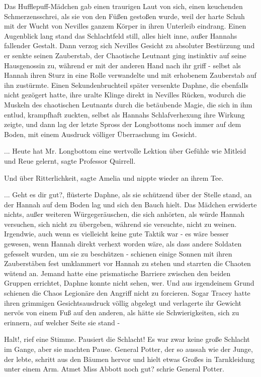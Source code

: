 Das Hufflepuff-Mädchen gab einen traurigen Laut von sich, einen keuchenden
Schmerzensschrei, als sie von den Füßen gestoßen wurde, weil der harte Schuh mit
der Wucht von Nevilles ganzem Körper in ihren Unterleib eindrang. Einen
Augenblick lang stand das Schlachtfeld still, alles hielt inne, außer Hannahs
fallender Gestalt. Dann verzog sich Nevilles Gesicht zu absoluter Bestürzung und
er senkte seinen Zauberstab, der Chaotische Leutnant ging instinktiv auf seine
Hausgenossin zu, während er mit der anderen Hand nach ihr griff - selbst als
Hannah ihren Sturz in eine Rolle verwandelte und mit erhobenem Zauberstab auf
ihn zustürmte. Einen Sekundenbruchteil später versenkte Daphne, die ebenfalls
nicht gezögert hatte, ihre uralte Klinge direkt in Nevilles Rücken, wodurch die
Muskeln des chaotischen Leutnants durch die betäubende Magie, die sich in ihm
entlud, krampfhaft zuckten, selbst als Hannahs Schlafverhexung ihre Wirkung
zeigte, und dann lag der letzte Spross der Longbottoms noch immer auf dem Boden,
mit einem Ausdruck völliger Überraschung im Gesicht.

... \glqq{}Heute hat Mr. Longbottom eine wertvolle Lektion über Gefühle wie
Mitleid und Reue gelernt\grqq{}, sagte Professor Quirrell.

\glqq{}Und über Ritterlichkeit\grqq{}, sagte Amelia und nippte wieder an ihrem
Tee.

... \glqq{}Geht es dir gut?\grqq{}, flüsterte Daphne, als sie schützend über der
Stelle stand, an der Hannah auf dem Boden lag und sich den Bauch hielt. Das
Mädchen erwiderte nichts, außer weiteren Würgegeräuschen, die sich anhörten, als
würde Hannah versuchen, sich nicht zu übergeben, während sie versuchte, nicht zu
weinen. Irgendwie, auch wenn es vielleicht keine gute Taktik war - es wäre
besser gewesen, wenn Hannah direkt verhext worden wäre, als dass andere Soldaten
gefesselt wurden, um sie zu beschützen - schienen einige Sonnen mit ihren
Zauberstäben fest umklammert vor Hannah zu stehen und starrten die Chaoten
wütend an. Jemand hatte eine prismatische Barriere zwischen den beiden Gruppen
errichtet, Daphne konnte nicht sehen, wer. Und aus irgendeinem Grund schienen
die Chaos Legionäre den Angriff nicht zu forcieren. Sogar Tracey hatte ihren
grimmigen Gesichtsausdruck völlig abgelegt und verlagerte ihr Gewicht nervös von
einem Fuß auf den anderen, als hätte sie Schwierigkeiten, sich zu erinnern, auf
welcher Seite sie stand -

\glqq{}Halt!\grqq{}, rief eine Stimme. \glqq{}Pausiert die Schlacht!\grqq{} Es war
zwar keine große Schlacht im Gange, aber sie machten Pause. General Potter, der
so aussah wie der Junge, der lebte, schritt aus den Bäumen hervor und hielt
etwas Großes in Tarnkleidung unter einem Arm. \glqq{}Atmet Miss Abbott noch
gut?\grqq{} schrie General Potter.

